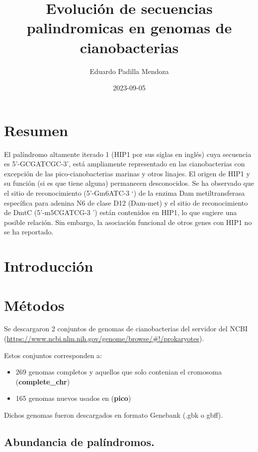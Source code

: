\documentclass[
]{book}
\title{Evolución de secuencias palindromicas en genomas de cianobacterias}
\author{Eduardo Padilla Mendoza}
\date{2023-09-05}
\providecommand{\tightlist}{%
  \setlength{\itemsep}{0pt}\setlength{\parskip}{0pt}}
\begin{document}
\maketitle

{
\setcounter{tocdepth}{1}
\tableofcontents
}
\hypertarget{resumen}{%
\chapter*{Resumen}\label{resumen}}

El palíndromo altamente iterado 1 (HIP1 por sus siglas en inglés) cuya secuencia es 5'-GCGATCGC-3', está ampliamente representado en las cianobacterias con excepción de las pico-cianobacterias marinas y otros linajes. El origen de HIP1 y su función (si es que tiene alguna) permanecen desconocidos. Se ha observado que el sitio de reconocimiento (5'-Gm6ATC-3 `) de la enzima Dam metiltransferasa específica para adenina N6 de clase D12 (Dam-met) y el sitio de reconocimiento de DmtC (5'-m5CGATCG-3 ') están contenidos en HIP1, lo que sugiere una posible relación. Sin embargo, la asociación funcional de otros genes con HIP1 no se ha reportado.

\hypertarget{introducciuxf3n}{%
\chapter{Introducción}\label{introducciuxf3n}}

\hypertarget{muxe9todos}{%
\chapter{Métodos}\label{muxe9todos}}

Se descargaron 2 conjuntos de genomas de cianobacterias del servidor del NCBI (\url{https://www.ncbi.nlm.nih.gov/genome/browse/\#!/prokaryotes}).

Estos conjuntos corresponden a:

\begin{itemize}
\tightlist
\item
  269 genomas completos y aquellos que solo contenian el cromosoma (\textbf{complete\_chr})
\item
  165 genomas nuevos usados en \citet{cabello2022elucidating} (\textbf{pico})
\end{itemize}

Dichos genomas fueron descargados en formato Genebank (.gbk o gbff).

\hypertarget{abundancia-de-paluxedndromos.}{%
\section{Abundancia de palíndromos.}\label{abundancia-de-paluxedndromos.}}
\end{document}
